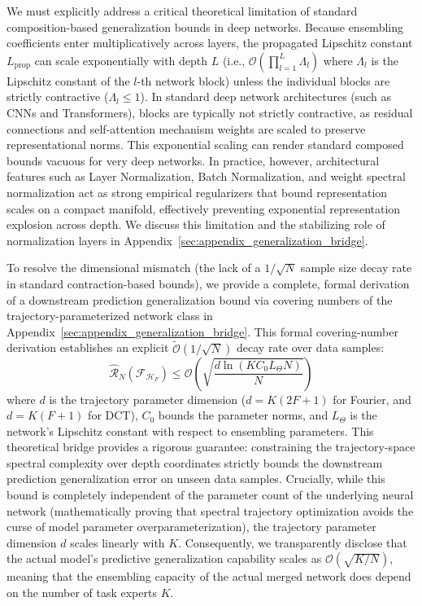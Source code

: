 We must explicitly address a critical theoretical limitation of standard composition-based generalization bounds in deep networks. Because ensembling coefficients enter multiplicatively across layers, the propagated Lipschitz constant $L_{\text{prop}}$ can scale exponentially with depth $L$ (i.e., $\mathcal{O}(\prod_{l=1}^L \Lambda_l)$ where $\Lambda_l$ is the Lipschitz constant of the $l$-th network block) unless the individual blocks are strictly contractive ($\Lambda_l \le 1$). In standard deep network architectures (such as CNNs and Transformers), blocks are typically not strictly contractive, as residual connections and self-attention mechanism weights are scaled to preserve representational norms. This exponential scaling can render standard composed bounds vacuous for very deep networks. In practice, however, architectural features such as Layer Normalization, Batch Normalization, and weight spectral normalization act as strong empirical regularizers that bound representation scales on a compact manifold, effectively preventing exponential representation explosion across depth. We discuss this limitation and the stabilizing role of normalization layers in Appendix~\ref{sec:appendix_generalization_bridge}.

To resolve the dimensional mismatch (the lack of a $1/\sqrt{N}$ sample size decay rate in standard contraction-based bounds), we provide a complete, formal derivation of a downstream prediction generalization bound via covering numbers of the trajectory-parameterized network class in Appendix~\ref{sec:appendix_generalization_bridge}. This formal covering-number derivation establishes an explicit $\widetilde{\mathcal{O}}(1/\sqrt{N})$ decay rate over data samples:
\begin{equation}
    \widehat{\mathcal{R}}_N(\mathcal{F}_{\mathcal{H}_F}) \le \mathcal{O}\left( \sqrt{\frac{d \ln(K C_0 L_{\Theta} N)}{N}} \right)
\end{equation}
where $d$ is the trajectory parameter dimension ($d = K(2F+1)$ for Fourier, and $d = K(F+1)$ for DCT), $C_0$ bounds the parameter norms, and $L_{\Theta}$ is the network's Lipschitz constant with respect to ensembling parameters. This theoretical bridge provides a rigorous guarantee: constraining the trajectory-space spectral complexity over depth coordinates strictly bounds the downstream prediction generalization error on unseen data samples. Crucially, while this bound is completely independent of the parameter count of the underlying neural network (mathematically proving that spectral trajectory optimization avoids the curse of model parameter overparameterization), the trajectory parameter dimension $d$ scales linearly with $K$. Consequently, we transparently disclose that the actual model's predictive generalization capability scales as $\mathcal{O}(\sqrt{K/N})$, meaning that the ensembling capacity of the actual merged network does depend on the number of task experts $K$.

